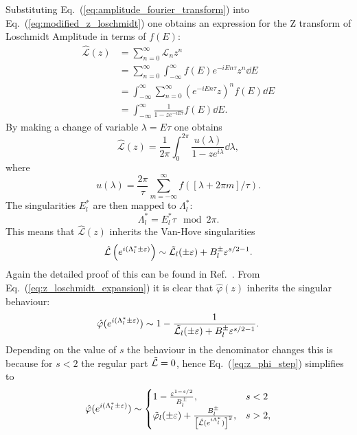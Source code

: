 \documentclass[12pt]{article}
\numberwithin{equation}{section}
\newcommand{\1}{\mathbb{1}}
\newcommand{\zphi}{\hat{\varphi}(z)}
\newcommand{\Lz}{\hat{\mathcal{L}}(z)}
\newcommand{\vanhove}{E^*_l}
\newcommand{\Lvanhove}{\Lambda^*_l}
\begin{document}
Substituting Eq.~(\ref{eq:amplitude_fourier_transform}) into Eq.~(\ref{eq:modified_z_loschmidt}) one obtains an expression for the Z transform of Loschmidt Amplitude in terms of $f(E)$:
\begin{align}
    \Lz&=\sum_{n=0}^\infty \mathcal{L}_n z^{n}
    \\
    &=\sum_{n=0}^\infty \int_{-\infty}^{\infty}f(E)e^{-iEn\tau}z^n \dd E
    \\
    &=\int_{-\infty}^\infty\sum_{n=0}^\infty \left(e^{-iEn\tau}z\right)^n f(E)\dd E
    \\
    &=\int_{-\infty}^{\infty} \frac{1}{1-ze^{-iE\tau}}f(E)\dd E. \label{eq:z_loschmidt_fe}
\end{align}
By making a change of variable $\lambda=E\tau$ one obtains 
\begin{equation}
    \Lz=\frac{1}{2\pi}\int_0^{2\pi}\frac{u(\lambda)}{1-ze^{i\lambda}} \dd\lambda,
\end{equation}
where 
\begin{equation}
    u(\lambda)=\frac{2\pi}{\tau}\sum_{m=-\infty}^{\infty}f\left([\lambda+2\pi m]/\tau\right).
\end{equation}
The singularities $\vanhove$ are then mapped to $\Lvanhove$:
\begin{equation}
    \Lvanhove=\vanhove\tau\mod 2\pi.
\end{equation}
This means that $\Lz$ inherits the Van-Hove singularities 
\begin{equation}
    \hat{\mathcal{L}}\left(e^{i(\Lvanhove\pm\varepsilon)}\right)\sim \Tilde{\mathcal{L}}_l (\pm \varepsilon) +B_l^{\pm}\varepsilon^{s/2-1}. \label{eq:z_loschmidt_expansion}
\end{equation}
Again the detailed proof of this can be found in Ref.~\cite{Thiel_2018}.
From Eq.~(\ref{eq:z_loschmidt_expansion}) it is clear that $\zphi$ inherits the singular behaviour:
\begin{equation}
    \hat{\varphi}(e^{i(\Lvanhove\pm\varepsilon)})\sim 1-\frac{1}{\Tilde{\mathcal{L}}_l (\pm \varepsilon) +B_l^{\pm}\varepsilon^{s/2-1}}. \label{eq:z_phi_step}
\end{equation}
Depending on the value of $s$ the behaviour in the denominator changes this is because for $s<2$ the regular part $\Tilde{\mathcal{L}}=0$, hence Eq.~(\ref{eq:z_phi_step}) simplifies to 
\begin{equation}
    \hat{\varphi}(e^{i(\Lvanhove\pm\varepsilon)})\sim 
    \begin{cases}
        1-\frac{\varepsilon^{1-s/2}}{B_l^{\pm}}, & s<2\\
        \Tilde{\varphi}_l (\pm\varepsilon)+\frac{B_l^{\pm}}{\left[\hat{\mathcal{L}}(e^{i\Lvanhove})\right]^2}, &s>2, 
    \end{cases}
\end{equation}
\end{document}
